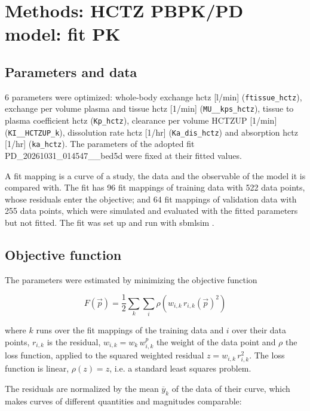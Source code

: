 \section{Methods: HCTZ PBPK/PD model: fit PK}

\subsection{Parameters and data}

6 parameters were optimized: whole-body exchange hctz [l/min] (\texttt{ftissue\_hctz}), exchange per volume plasma and tissue hctz [1/min] (\texttt{MU\_\_kps\_hctz}), tissue to plasma coefficient hctz (\texttt{Kp\_hctz}), clearance per volume HCTZUP [1/min] (\texttt{KI\_\_HCTZUP\_k}), dissolution rate hctz [1/hr] (\texttt{Ka\_dis\_hctz}) and absorption hctz [1/hr] (\texttt{ka\_hctz}). The parameters of the adopted fit PD\_20261031\_014547\_\_bed5d were fixed at their fitted values.

A fit mapping is a curve of a study, the data and the observable of the model it is compared with. The fit has 96 fit mappings of training data with 522 data points, whose residuals enter the objective; and 64 fit mappings of validation data with 255 data points, which were simulated and evaluated with the fitted parameters but not fitted. The fit was set up and run with sbmlsim \cite{Koenig2026_sbmlsim}.

\subsection{Objective function}

The parameters were estimated by minimizing the objective function

\begin{equation}
F(\vec{p}) = \frac{1}{2} \sum_{k} \sum_{i} \rho\left(w_{i,k}\, r_{i,k}(\vec{p})^2\right)
\end{equation}

where $k$ runs over the fit mappings of the training data and $i$ over their data points, $r_{i,k}$ is the residual, $w_{i,k} = w_k\, w^{p}_{i,k}$ the weight of the data point and $\rho$ the loss function, applied to the squared weighted residual $z = w_{i,k}\, r_{i,k}^2$. The loss function is linear, $\rho(z) = z$, i.e. a standard least squares problem.

The residuals are normalized by the mean $\overline{y}_k$ of the data of their curve, which makes curves of different quantities and magnitudes comparable:

